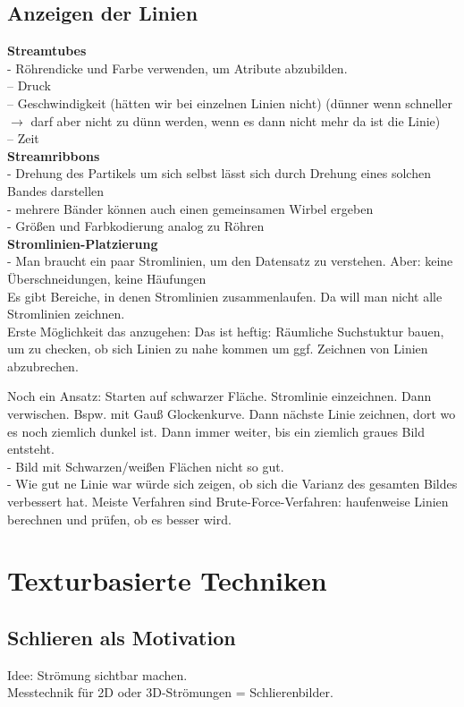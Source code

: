 \documentclass{article}
\begin{document}
\subsection{Anzeigen der Linien}
\textbf{Streamtubes}\\
- Röhrendicke und Farbe verwenden, um Atribute abzubilden.\\
-- Druck\\
-- Geschwindigkeit (hätten wir bei einzelnen Linien nicht) (dünner wenn schneller $\rightarrow$ darf aber nicht zu dünn werden, wenn es dann nicht mehr da ist die Linie)\\
-- Zeit\\

\noindent \textbf{Streamribbons}\\
- Drehung des Partikels um sich selbst lässt sich durch Drehung eines solchen Bandes darstellen\\
- mehrere Bänder können auch einen gemeinsamen Wirbel ergeben\\
- Größen und Farbkodierung analog zu Röhren\\

\noindent \textbf{Stromlinien-Platzierung}\\
- Man braucht ein paar Stromlinien, um den Datensatz zu verstehen. Aber: keine Überschneidungen, keine Häufungen\\
Es gibt Bereiche, in denen Stromlinien zusammenlaufen. Da will man nicht alle Stromlinien zeichnen.\\
Erste Möglichkeit das anzugehen:
Das ist heftig:  Räumliche Suchstuktur bauen, um zu checken, ob sich Linien zu nahe kommen um ggf. Zeichnen von Linien abzubrechen.

\noindent Noch ein Ansatz:
Starten auf schwarzer Fläche. Stromlinie einzeichnen. Dann verwischen. Bspw. mit Gauß Glockenkurve. Dann nächste Linie zeichnen, dort wo es noch ziemlich dunkel ist. Dann immer weiter, bis ein ziemlich graues Bild entsteht.\\
- Bild mit Schwarzen/weißen Flächen nicht so gut.\\
- Wie gut ne Linie war würde sich zeigen, ob sich die Varianz  des gesamten Bildes verbessert hat.
Meiste Verfahren sind Brute-Force-Verfahren: haufenweise Linien berechnen und prüfen, ob es besser wird.

\pagebreak
\section{Texturbasierte Techniken}
\subsection{Schlieren als Motivation}
Idee: Strömung sichtbar machen.\\
Messtechnik für 2D oder 3D-Strömungen = Schlierenbilder.\\
\end{document}
